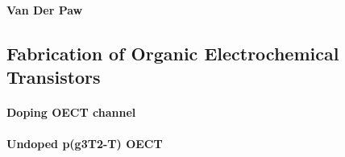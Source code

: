 \paragraph{Van Der Paw}


\subsection{Fabrication of Organic Electrochemical Transistors}

\paragraph{Doping OECT channel}


\paragraph{Undoped p(g3T2-T) OECT}



